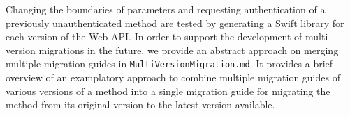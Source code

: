 Changing the boundaries of parameters and requesting authentication of a previously unauthenticated method are tested by generating a Swift library for each version of the Web API. In order to support the development of multi-version migrations in the future, we provide an abstract approach on merging multiple migration guides in \texttt{MultiVersionMigration.md}. It provides a brief overview of an examplatory approach to combine multiple migration guides of various versions of a method into a single migration guide for migrating the method from its original version to the latest version available.
